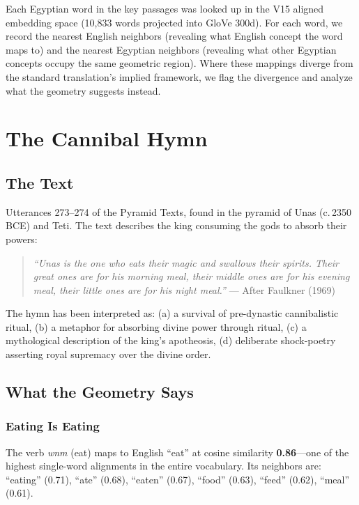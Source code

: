 \documentclass[11pt, a4paper]{article}
\begin{document}
Each Egyptian word in the key passages was looked up in the V15 aligned embedding space (10,833 words projected into GloVe 300d). For each word, we record the nearest English neighbors (revealing what English concept the word maps to) and the nearest Egyptian neighbors (revealing what other Egyptian concepts occupy the same geometric region). Where these mappings diverge from the standard translation's implied framework, we flag the divergence and analyze what the geometry suggests instead.

\section{The Cannibal Hymn}
\label{sec:cannibal}

\subsection{The Text}

Utterances 273--274 of the Pyramid Texts, found in the pyramid of Unas (c.\,2350 BCE) and Teti. The text describes the king consuming the gods to absorb their powers:

\begin{quote}
\textit{``Unas is the one who eats their magic and swallows their spirits. Their great ones are for his morning meal, their middle ones are for his evening meal, their little ones are for his night meal.''} --- After Faulkner (1969)
\end{quote}

The hymn has been interpreted as: (a) a survival of pre-dynastic cannibalistic ritual, (b) a metaphor for absorbing divine power through ritual, (c) a mythological description of the king's apotheosis, (d) deliberate shock-poetry asserting royal supremacy over the divine order.

\subsection{What the Geometry Says}

\subsubsection{Eating Is Eating}

The verb \textit{wnm} (eat) maps to English ``eat'' at cosine similarity \textbf{0.86}---one of the highest single-word alignments in the entire vocabulary. Its neighbors are: ``eating'' (0.71), ``ate'' (0.68), ``eaten'' (0.67), ``food'' (0.63), ``feed'' (0.62), ``meal'' (0.61).
\end{document}
